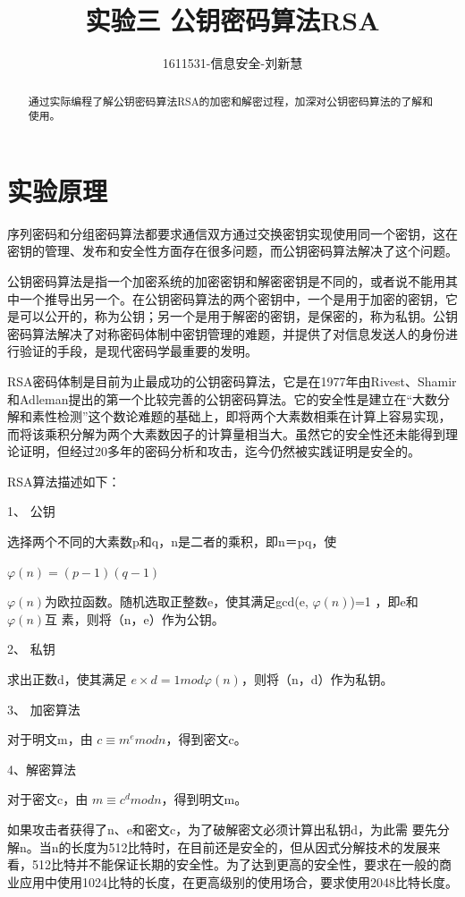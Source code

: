 \documentclass[UTF8,a4paper]{article}
\title{实验三 公钥密码算法RSA}
\author{1611531-信息安全-刘新慧}
\date{}
\begin{document}
\maketitle

\begin{abstract}
通过实际编程了解公钥密码算法RSA的加密和解密过程，加深对公钥密码算法的了解和使用。\par 
\end{abstract}
\tableofcontents
\newpage

	\section{实验原理}
序列密码和分组密码算法都要求通信双方通过交换密钥实现使用同一个密钥，这在密钥的管理、发布和安全性方面存在很多问题，而公钥密码算法解决了这个问题。\par 
公钥密码算法是指一个加密系统的加密密钥和解密密钥是不同的，或者说不能用其中一个推导出另一个。在公钥密码算法的两个密钥中，一个是用于加密的密钥，它是可以公开的，称为公钥；另一个是用于解密的密钥，是保密的，称为私钥。公钥密码算法解决了对称密码体制中密钥管理的难题，并提供了对信息发送人的身份进行验证的手段，是现代密码学最重要的发明。\par 
RSA密码体制是目前为止最成功的公钥密码算法，它是在1977年由Rivest、Shamir和Adleman提出的第一个比较完善的公钥密码算法。它的安全性是建立在“大数分解和素性检测”这个数论难题的基础上，即将两个大素数相乘在计算上容易实现，而将该乘积分解为两个大素数因子的计算量相当大。虽然它的安全性还未能得到理论证明，但经过20多年的密码分析和攻击，迄今仍然被实践证明是安全的。\par 
RSA算法描述如下：\par 
1、	公钥\par 
选择两个不同的大素数p和q，n是二者的乘积，即n＝pq，使\par 
\begin{center}
$\varphi(n)=(p-1)(q-1) $\par 
\end{center}


 $\varphi(n)$为欧拉函数。随机选取正整数e，使其满足gcd(e, $\varphi(n)$)=1 ，即e和  $\varphi(n)$互
素，则将（n，e）作为公钥。\par 
2、	私钥\par 
求出正数d，使其满足 $e\times d=1mod\varphi(n) $，则将（n，d）作为私钥。\par 
3、	加密算法\par 
对于明文m，由 $c\equiv m^e mod n $，得到密文c。\par 
4、解密算法\par 
对于密文c，由  $m\equiv c^d mod n $，得到明文m。\par 
如果攻击者获得了n、e和密文c，为了破解密文必须计算出私钥d，为此需
要先分解n。当n的长度为512比特时，在目前还是安全的，但从因式分解技术的发展来看，512比特并不能保证长期的安全性。为了达到更高的安全性，要求在一般的商业应用中使用1024比特的长度，在更高级别的使用场合，要求使用2048比特长度。\par 
\end{document}
